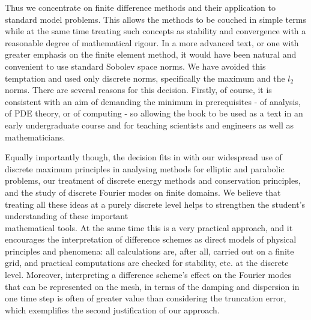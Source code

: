 \documentclass[10pt]{article}
\begin{document}
Thus we concentrate on finite difference methods and their application to standard model problems. This allows the methods to be couched in simple terms while at the same time treating such concepts as stability and convergence with a reasonable degree of mathematical rigour. In a more advanced text, or one with greater emphasis on the finite element method, it would have been natural and convenient to use standard Sobolev space norms. We have avoided this temptation and used only discrete norms, specifically the maximum and the \(l_{2}\) norms. There are several reasons for this decision. Firstly, of course, it is consistent with an aim of demanding the minimum in prerequisites - of analysis, of PDE theory, or of computing - so allowing the book to be used as a text in an early undergraduate course and for teaching scientists and engineers as well as mathematicians.

Equally importantly though, the decision fits in with our widespread use of discrete maximum principles in analysing methods for elliptic and parabolic problems, our treatment of discrete energy methods and conservation principles, and the study of discrete Fourier modes on finite domains. We believe that treating all these ideas at a purely discrete level helps to strengthen the student's understanding of these important\\
mathematical tools. At the same time this is a very practical approach, and it encourages the interpretation of difference schemes as direct models of physical principles and phenomena: all calculations are, after all, carried out on a finite grid, and practical computations are checked for stability, etc. at the discrete level. Moreover, interpreting a difference scheme's effect on the Fourier modes that can be represented on the mesh, in terms of the damping and dispersion in one time step is often of greater value than considering the truncation error, which exemplifies the second justification of our approach.
\end{document}

